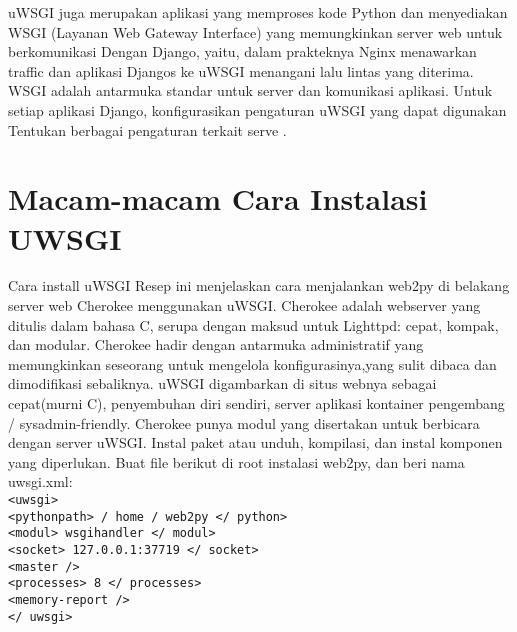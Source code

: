 	uWSGI juga merupakan aplikasi yang memproses kode Python dan menyediakan WSGI (Layanan Web Gateway Interface) yang memungkinkan server web untuk berkomunikasi Dengan Django, yaitu, dalam prakteknya Nginx menawarkan traffic dan aplikasi Djangos ke uWSGI menangani lalu lintas yang diterima. WSGI adalah antarmuka standar untuk server dan komunikasi aplikasi. Untuk setiap aplikasi Django, konfigurasikan pengaturan uWSGI yang dapat digunakan Tentukan berbagai pengaturan terkait serve \cite{wood2018ccbuilder}.\\
	
	\section{Macam-macam Cara Instalasi UWSGI}
	Cara install uWSGI Resep ini menjelaskan cara menjalankan web2py di belakang server web Cherokee menggunakan uWSGI. Cherokee adalah webserver yang ditulis dalam bahasa C, serupa dengan maksud untuk Lighttpd: cepat, kompak, dan modular. Cherokee hadir dengan antarmuka administratif yang memungkinkan seseorang untuk mengelola konfigurasinya,yang sulit dibaca dan dimodifikasi sebaliknya. uWSGI digambarkan di situs webnya sebagai cepat(murni C), penyembuhan diri sendiri, server aplikasi kontainer pengembang / sysadmin-friendly. Cherokee punya modul yang disertakan untuk berbicara dengan server uWSGI. Instal paket atau unduh, kompilasi, dan instal komponen yang diperlukan. Buat file berikut di root instalasi web2py, dan beri nama uwsgi.xml:\\
	
\verb|<uwsgi>| \\
\verb|<pythonpath> / home / web2py </ python>| \\
\verb|<modul> wsgihandler </ modul>| \\
\verb|<socket> 127.0.0.1:37719 </ socket>| \\
\verb|<master />| \\
\verb|<processes> 8 </ processes>| \\
\verb|<memory-report />| \\
\verb|</ uwsgi>| \\


